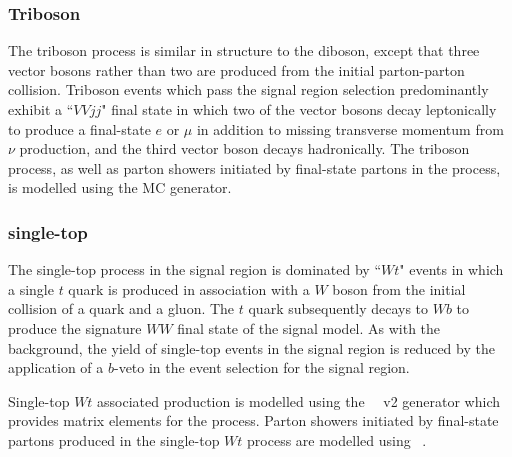 \subsubsection{Triboson}
\label{sec:triboson_description}

The triboson process is similar in structure to the diboson, except that three vector bosons rather than two are produced from the initial parton-parton collision. Triboson events which pass the signal region selection predominantly exhibit a ``\(VVjj\)" final state in which two of the vector bosons decay leptonically to produce a final-state \(e\) or \(\mu\) in addition to missing transverse momentum from \(\nu\) production, and the third vector boson decays hadronically. The triboson process, as well as parton showers initiated by final-state partons in the process, is modelled using the \SHERPA[2.2] MC generator. 

\subsubsection{single-top}
\label{sec:stop_description}

The single-top process in the signal region is dominated by ``\(Wt\)" events \cite{stopWt} in which a single \(t\) quark is produced in association with a \(W\) boson from the initial collision of a quark and a gluon. The \(t\) quark subsequently decays to \(Wb\) to produce the signature \(WW\) final state of the signal model. As with the \ttbar background, the yield of single-top events in the signal region is reduced by the application of a \(b\)-veto in the event selection for the signal region.    

Single-top \(Wt\) associated production is modelled using the \POWHEGBOX~\cite{Re:2010bp,Nason:2004rx,Frixione:2007vw,Alioli:2010xd}~v2 generator which provides matrix elements for the process. Parton showers initiated by final-state partons produced in the single-top \(Wt\) process are modelled using ~\cite{Sjostrand:2014zea}. 

